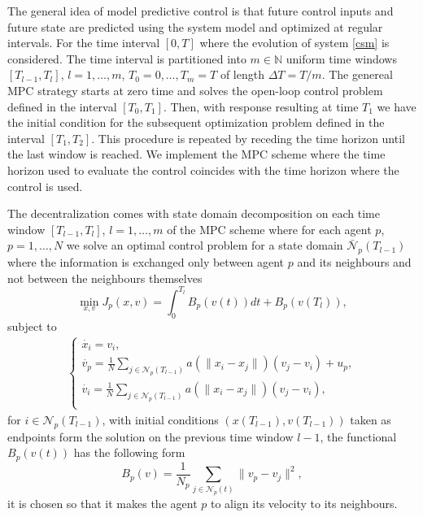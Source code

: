 \documentclass[a4paper, english]{article}
\newcommand{\D}{\displaystyle}
\begin{document}
 The general idea of model predictive control is that future control inputs and future state are predicted using the system model and optimized at regular intervals. For
 the time interval $[0, T]$ where the evolution of system \eqref{csm} is considered.
 The time interval is partitioned into $m\in \mathbb{N}$ uniform time windows $[T_{l-1}, T_{l}]$, $l = 1, \dots, m$, $T_0 = 0, \dots, T_m = T$  of length  $\Delta T = T/m$. The genereal MPC strategy starts at zero time and solves the open-loop control problem defined in the interval $[T_0, T_1]$. Then, with response  resulting at time $T_1$ we have the initial condition for the subsequent optimization problem defined in the interval $[T_1, T_2]$. This procedure is repeated by receding the time horizon until the last window is reached. We implement the MPC scheme where the time horizon used to evaluate the control coincides with the time horizon where the control is used.


   The decentralization comes with state domain decomposition on each time window $[T_{l-1}, T_{l}]$, $l = 1, \dots, m$  of the MPC scheme where for each agent $p$, $p = 1, \dots, N$ we solve an optimal control problem for a state domain $\bar{\mathcal{N}}_p(T_{l-1})$ where the information is exchanged only between agent $p$ and its neighbours and not between the neighbours themselves
   \begin{equation}
    \min_{x, v} J_p(x, v) = \int_{0}^{T_l}B_p(v(t))dt + B_p(v(T_l)),
   \label{jp}
   \end{equation}
   subject to
   \begin{align}
   \begin{cases}
   \D
   \dot{x_i} = v_i,\\
   \dot{v_p} = \frac{1}{N}\sum_{j\in \mathcal{N}_p(T_{l-1})}a(\|x_i - x_j\|)(v_j - v_i) + u_p, \\
   \dot{v_i} = \frac{1}{N}\sum_{j\in \mathcal{N}_p(T_{l-1})}a(\|x_i - x_j\|)(v_j - v_i),\\
   \end{cases}
   \label{csmp}
   \end{align}
  for $i\in\mathcal{N}_p(T_{l-1})$, with initial conditions $(x(T_{l-1}), v(T_{l-1}))$ taken as endpoints form the solution on the previous time window $l-1$,
  the functional $B_p(v(t))$ has the following form
  \begin{equation}
  B_p(v) = \frac{1}{N_p}\sum_{j \in \mathcal{N}_p(t)} \| v_p - v_j \|^2,
  \label{bp}
  \end{equation}
  it is chosen so that it makes the agent  $p$ to align its velocity to its neighbours.
\end{document}
